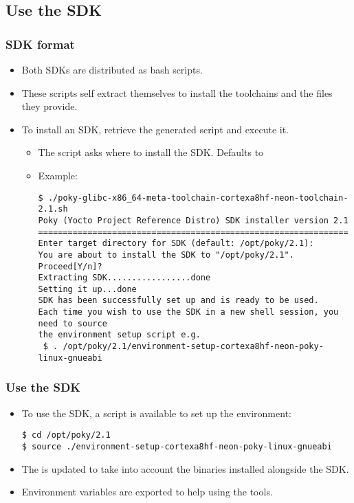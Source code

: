 \subsection{Use the SDK}

\begin{frame}[fragile]
  \frametitle{SDK format}
  \begin{itemize}
    \item Both SDKs are distributed as bash scripts.
    \item These scripts self extract themselves to install the
      toolchains and the files they provide.
    \item To install an SDK, retrieve the generated script and execute
      it.
      \begin{itemize}
        \item The script asks where to install the SDK. Defaults to
        \item Example: 
        \begin{block}{}
          \begin{verbatim}
$ ./poky-glibc-x86_64-meta-toolchain-cortexa8hf-neon-toolchain-2.1.sh
Poky (Yocto Project Reference Distro) SDK installer version 2.1
===============================================================
Enter target directory for SDK (default: /opt/poky/2.1):
You are about to install the SDK to "/opt/poky/2.1". Proceed[Y/n]?
Extracting SDK.................done
Setting it up...done
SDK has been successfully set up and is ready to be used.
Each time you wish to use the SDK in a new shell session, you need to source
the environment setup script e.g.
 $ . /opt/poky/2.1/environment-setup-cortexa8hf-neon-poky-linux-gnueabi
          \end{verbatim}
        \end{block}
      \end{itemize}
  \end{itemize}
\end{frame}

\begin{frame}[fragile]
  \frametitle{Use the SDK}
  \begin{itemize}
    \item To use the SDK, a script is available to set up the
      environment:
      \begin{block}{}
        \begin{verbatim}
$ cd /opt/poky/2.1
$ source ./environment-setup-cortexa8hf-neon-poky-linux-gnueabi
        \end{verbatim}
      \end{block}
    \item The  is updated to take into account the binaries
      installed alongside the SDK.
    \item Environment variables are exported to help using the tools.
  \end{itemize}
\end{frame}

